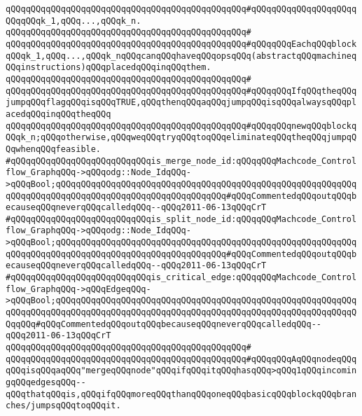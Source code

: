 \verb|qQQqqQQqqQQqqQQqqQQqqQQqqQQqqQQqqQQqqQQqqQQqqQQq#qQQqqQQqqQQqqQQqqQQqqQQqqQQqk_1,qQQq...,qQQqk_n.|\newline
\verb|qQQqqQQqqQQqqQQqqQQqqQQqqQQqqQQqqQQqqQQqqQQqqQQq#|\newline
\verb|qQQqqQQqqQQqqQQqqQQqqQQqqQQqqQQqqQQqqQQqqQQqqQQq#qQQqqQQqEachqQQqblockqQQqk_1,qQQq...,qQQqk_nqQQqcanqQQqhaveqQQqopsqQQq(abstractqQQqmachineqQQqinstructions)qQQqplacedqQQqinqQQqthem.|\newline
\verb|qQQqqQQqqQQqqQQqqQQqqQQqqQQqqQQqqQQqqQQqqQQqqQQq#|\newline
\verb|qQQqqQQqqQQqqQQqqQQqqQQqqQQqqQQqqQQqqQQqqQQqqQQq#qQQqqQQqIfqQQqtheqQQqjumpqQQqflagqQQqisqQQqTRUE,qQQqthenqQQqaqQQqjumpqQQqisqQQqalwaysqQQqplacedqQQqinqQQqtheqQQq|\newline
\verb|qQQqqQQqqQQqqQQqqQQqqQQqqQQqqQQqqQQqqQQqqQQqqQQq#qQQqqQQqnewqQQqblockqQQqk_n;qQQqotherwise,qQQqweqQQqtryqQQqtoqQQqeliminateqQQqtheqQQqjumpqQQqwhenqQQqfeasible.|\newline
\newline
\newline
\newline
\verb|#qQQqqQQqqQQqqQQqqQQqqQQqqQQqis_merge_node_id:qQQqqQQqMachcode_Controlflow_GraphqQQq->qQQqodg::Node_IdqQQq->qQQqBool;qQQqqQQqqQQqqQQqqQQqqQQqqQQqqQQqqQQqqQQqqQQqqQQqqQQqqQQqqQQqqQQqqQQqqQQqqQQqqQQqqQQqqQQqqQQqqQQqqQQqqQQq#qQQqCommentedqQQqoutqQQqbecauseqQQqneverqQQqcalledqQQq--qQQq2011-06-13qQQqCrT|\newline
\verb|#qQQqqQQqqQQqqQQqqQQqqQQqqQQqis_split_node_id:qQQqqQQqMachcode_Controlflow_GraphqQQq->qQQqodg::Node_IdqQQq->qQQqBool;qQQqqQQqqQQqqQQqqQQqqQQqqQQqqQQqqQQqqQQqqQQqqQQqqQQqqQQqqQQqqQQqqQQqqQQqqQQqqQQqqQQqqQQqqQQqqQQqqQQqqQQq#qQQqCommentedqQQqoutqQQqbecauseqQQqneverqQQqcalledqQQq--qQQq2011-06-13qQQqCrT|\newline
\verb|#qQQqqQQqqQQqqQQqqQQqqQQqqQQqis_critical_edge:qQQqqQQqMachcode_Controlflow_GraphqQQq->qQQqEdgeqQQq->qQQqBool;qQQqqQQqqQQqqQQqqQQqqQQqqQQqqQQqqQQqqQQqqQQqqQQqqQQqqQQqqQQqqQQqqQQqqQQqqQQqqQQqqQQqqQQqqQQqqQQqqQQqqQQqqQQqqQQqqQQqqQQqqQQqqQQqqQQqqQQq#qQQqCommentedqQQqoutqQQqbecauseqQQqneverqQQqcalledqQQq--qQQq2011-06-13qQQqCrT|\newline
\verb|qQQqqQQqqQQqqQQqqQQqqQQqqQQqqQQqqQQqqQQqqQQqqQQq#|\newline
\verb|qQQqqQQqqQQqqQQqqQQqqQQqqQQqqQQqqQQqqQQqqQQqqQQq#qQQqqQQqAqQQqnodeqQQqqQQqisqQQqaqQQq"mergeqQQqnode"qQQqifqQQqitqQQqhasqQQq>qQQq1qQQqincomingqQQqedgesqQQq--qQQqthatqQQqis,qQQqifqQQqmoreqQQqthanqQQqoneqQQqbasicqQQqblockqQQqbranches/jumpsqQQqtoqQQqit.|\newline
